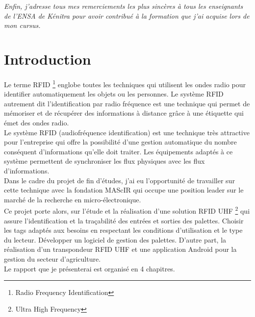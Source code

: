 \documentclass[11pt, a4paper, twoside]{book}
\begin{document}
\emph{Enfin, j’adresse tous mes remerciements les plus sincères à tous les enseignants de l’ENSA de Kénitra pour avoir contribué à la formation que j’ai acquise lors de mon cursus.}
\tableofcontents

\listoffigures

\listoftables

\chapter*{Introduction}
Le terme RFID \footnote{Radio Frequency Identification} englobe toutes les techniques qui utilisent les ondes radio pour identifier automatiquement les objets ou les personnes. Le système RFID autrement dit l'identification par radio fréquence est une technique qui permet de mémoriser et de récupérer des informations à distance grâce à une étiquette qui émet des ondes radio.\\

Le système RFID (audiofréquence identification) est une technique très attractive pour l'entreprise qui offre la possibilité d'une gestion automatique du nombre conséquent d'informations qu'elle doit traiter. Les équipements adaptés à ce système permettent de synchroniser les flux physiques avec les flux d'informations.\\

Dans le cadre du projet de fin d'études, j'ai eu l'opportunité de travailler sur cette technique avec la fondation MAScIR qui occupe une position leader sur le marché de la recherche en micro-électronique.\\

Ce projet porte alors, sur l'étude et la réalisation d’une solution RFID UHF \footnote{Ultra High Frequency} qui assure l’identification et la traçabilité des entrées et sorties des palettes. Choisir les tags adaptés aux besoins en respectant les conditions d’utilisation et le type du lecteur. Développer un logiciel de gestion des palettes. D’autre part, la réalisation d’un transpondeur RFID UHF et une application Android pour la gestion du secteur d'agriculture.\\

Le rapport que je présenterai est organisé en 4 chapitres.
\end{document}
